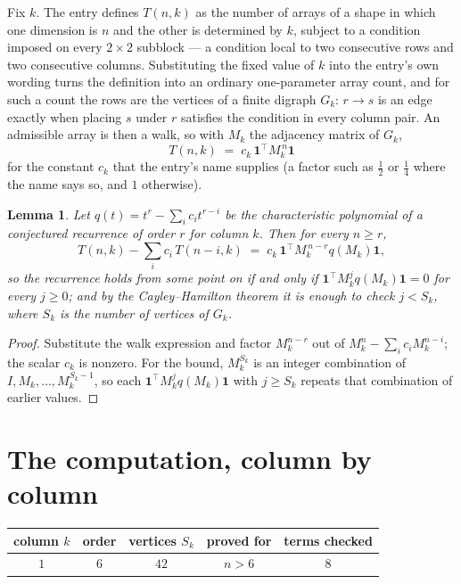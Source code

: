 \documentclass[11pt,a4paper]{article}
\theoremstyle{plain}
\newtheorem{lemma}[theorem]{Lemma}
\theoremstyle{definition}
\begin{document}
Fix $k$. The entry defines $T(n,k)$ as the number of arrays of a shape in which one dimension
is $n$ and the other is determined by $k$, subject to a condition imposed on every
$2\times2$ subblock --- a condition local to two consecutive rows and two consecutive columns.
Substituting the fixed value of $k$ into the entry's own wording turns the definition into an
ordinary one-parameter array count, and for such a count the rows are the vertices of a finite
digraph $G_k$: $r\to s$ is an edge exactly when placing $s$ under $r$ satisfies the condition
in every column pair. An admissible array is then a walk, so with $M_k$ the adjacency matrix
of $G_k$,
\[
T(n,k)\;=\;c_k\,\mathbf{1}^{\!\top}M_k^{\,n}\mathbf{1}
\]
for the constant $c_k$ that the entry's name supplies (a factor such as $\tfrac12$ or
$\tfrac14$ where the name says so, and $1$ otherwise).

\begin{lemma}\label{lem:crit}
Let $q(t)=t^{r}-\sum_i c_it^{r-i}$ be the characteristic polynomial of a conjectured
recurrence of order $r$ for column $k$. Then for every $n\ge r$,
\[
T(n,k)-\sum_i c_i\,T(n-i,k)\;=\;c_k\,\mathbf{1}^{\!\top}M_k^{\,n-r}q(M_k)\mathbf{1},
\]
so the recurrence holds from some point on if and only if
$\mathbf{1}^{\!\top}M_k^{j}q(M_k)\mathbf{1}=0$ for every $j\ge0$; and by the
Cayley--Hamilton theorem it is enough to check $j<S_k$, where $S_k$ is the number of vertices
of $G_k$.
\end{lemma}

\begin{proof}
Substitute the walk expression and factor $M_k^{n-r}$ out of $M_k^{n}-\sum_ic_iM_k^{n-i}$;
the scalar $c_k$ is nonzero. For the bound, $M_k^{S_k}$ is an integer combination of
$I,M_k,\dots,M_k^{S_k-1}$, so each $\mathbf{1}^{\!\top}M_k^{j}q(M_k)\mathbf{1}$ with
$j\ge S_k$ repeats that combination of earlier values.
\end{proof}

\section{The computation, column by column}

\begin{center}
\begin{tabular}{ccccc}
column $k$ & order & vertices $S_k$ & proved for & terms checked \\ \hline
$1$ & $6$ & $42$ & $n>6$ & $8$ \\
\end{tabular}
\end{center}
\end{document}
